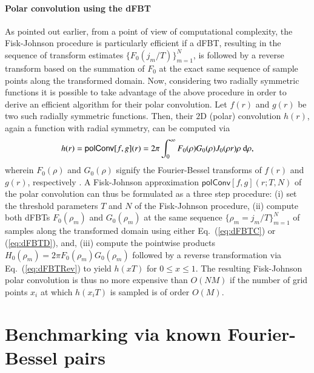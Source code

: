 \documentclass[review]{elsarticle}
\begin{document}
\paragraph{Polar convolution using the dFBT}

As pointed out earlier, from a point of view of computational complexity, the 
Fisk-Johnson procedure is particularly efficient if a dFBT, resulting
in the sequence of transform estimates $\{F_0(j_m/T)\}_{m=1}^{N}$, is followed 
by a reverse transform based on the summation of $F_0$ at the exact same 
sequence of sample points along the transformed domain. 
Now, considering two radially symmetric functions it is possible to take
advantage of the above procedure in order to derive an efficient algorithm for
their polar convolution. Let $f(r)$ and $g(r)$ be two such radially symmetric
functions. Then, their $2$D (polar) convolution $h(r)$, again a function with
radial symmetry, can be computed via \cite{Baddour:2009} 
\begin{equation}
h(r) = {\mathsf{polConv}}[f,g](r) = 2 \pi \int_{0}^\infty 
F_0(\rho) G_0(\rho) J_0(\rho r)\rho~{\rm{d}}\rho, \label{eq:polConv}
\end{equation}
wherein $F_0(\rho)$ and $G_0(\rho)$ signify the Fourier-Bessel transforms of
$f(r)$ and $g(r)$, respectively \cite{comment:polConv}. A Fisk-Johnson 
approximation ${\mathsf{polConv}}[f,g](r;T,N)$ of the polar convolution can thus be 
formulated as a three step procedure:
(i) set the threshold parameters $T$ and $N$ of the Fisk-Johnson procedure,
(ii) compute both dFBTs $F_0(\rho_m)$ and $G_0(\rho_m)$
at the same sequence $\{\rho_m = j_m/T\}_{m=1}^N$ of samples along the 
transformed domain using either Eq.~(\ref{eq:dFBTC}) or (\ref{eq:dFBTD}), and,
(iii) compute the pointwise products $H_0(\rho_m)=2\pi F_0(\rho_m)G_0(\rho_m)$ 
followed by a reverse transformation via Eq.~(\ref{eq:dFBTRev}) to yield
$h(xT)$ for $0\leq x \leq 1$.
The resulting Fisk-Johnson polar convolution is thus no more expensive than
$O(NM)$ if the number of grid points $x_i$ at which $h(x_iT)$ is sampled  
is of order $O(M)$.

\section{Benchmarking via known Fourier-Bessel pairs}
\label{sec:examples}
\end{document}
